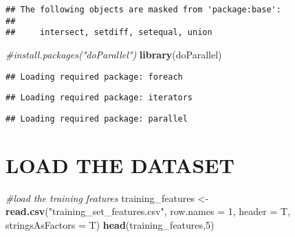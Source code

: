 \documentclass[
]{article}
\newenvironment{Shaded}{\begin{snugshade}}{\end{snugshade}}
\newcommand{\AttributeTok}[1]{\textcolor[rgb]{0.13,0.29,0.53}{#1}}
\newcommand{\CommentTok}[1]{\textcolor[rgb]{0.56,0.35,0.01}{\textit{#1}}}
\newcommand{\DecValTok}[1]{\textcolor[rgb]{0.00,0.00,0.81}{#1}}
\newcommand{\FunctionTok}[1]{\textcolor[rgb]{0.13,0.29,0.53}{\textbf{#1}}}
\newcommand{\NormalTok}[1]{#1}
\newcommand{\OtherTok}[1]{\textcolor[rgb]{0.56,0.35,0.01}{#1}}
\newcommand{\StringTok}[1]{\textcolor[rgb]{0.31,0.60,0.02}{#1}}
\begin{document}
\begin{verbatim}
## The following objects are masked from 'package:base':
## 
##     intersect, setdiff, setequal, union
\end{verbatim}

\begin{Shaded}
\begin{Highlighting}[]
\CommentTok{\#install.packages("doParallel")}
\FunctionTok{library}\NormalTok{(doParallel)}
\end{Highlighting}
\end{Shaded}

\begin{verbatim}
## Loading required package: foreach
\end{verbatim}

\begin{verbatim}
## Loading required package: iterators
\end{verbatim}

\begin{verbatim}
## Loading required package: parallel
\end{verbatim}

\section{LOAD THE DATASET}\label{load-the-dataset}

\begin{Shaded}
\begin{Highlighting}[]
\CommentTok{\#load the training features}
\NormalTok{training\_features }\OtherTok{\textless{}{-}} \FunctionTok{read.csv}\NormalTok{(}\StringTok{"training\_set\_features.csv"}\NormalTok{, }\AttributeTok{row.names =} \DecValTok{1}\NormalTok{, }\AttributeTok{header =}\NormalTok{ T, }\AttributeTok{stringsAsFactors =}\NormalTok{ T)}
\FunctionTok{head}\NormalTok{(training\_features,}\DecValTok{5}\NormalTok{)}
\end{Highlighting}
\end{Shaded}
\end{document}
